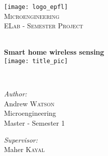 

\usepackage[pdftex]{graphicx} 

\begin{titlepage}
\nocite{*}      %
  \begin{center}
     
     
    \texttt{[image: logo\_epfl]}\\[1.5cm]
     
    \textsc{\LARGE Microengineering }\\[1.0cm]

    \textsc{\Large ELab - Semester Project}\\[0.1cm]

    \vfill 
     
    \HRule \\[0.7cm]
    { \huge \bfseries Smart home wireless sensing}\\[0.4cm]

    \texttt{[image: title\_pic]} 
     
    \HRule \\[2.0cm]
     
    \begin{minipage}{0.4\textwidth}
      \begin{flushleft} \large
        \emph{Author:} \\
        Andrew \textsc{Watson}\\[0.8cm]

        Microengineering\\
        Master - Semester 1\\[0.5cm]
      \end{flushleft}
    \end{minipage}
    \begin{minipage}{0.4\textwidth}
      \begin{flushright} \large
        \emph{Supervisor:} \\
        Maher \textsc{Kayal}\\[0.5cm]


\end{flushright}
\end{minipage}
\end{center}
\end{titlepage}
